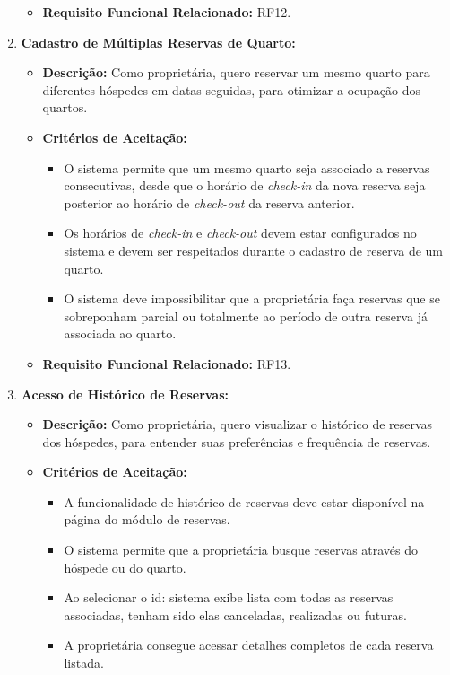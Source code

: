 \documentclass[
	12pt,				%
	openany,			%
	twoside,			%
	a4paper,			%
	english,			%
	french,				%
	spanish,			%
	brazil				%
	]{abntex2}
\begin{document}
\begin{enumerate}[label=\textbf{\arabic*.}]
\begin{itemize}
\begin{itemize}
	 	\end{itemize}
	 	\item \textbf{Requisito Funcional Relacionado:} RF12.
	 \end{itemize} 
	  \item \textbf{Cadastro de Múltiplas Reservas de Quarto:}
	 \begin{itemize}
	 	\item \textbf{Descrição:} Como proprietária, quero reservar um mesmo quarto para diferentes hóspedes em datas seguidas, para otimizar a ocupação dos quartos.
	 	\item \textbf{Critérios de Aceitação:}
	 	\begin{itemize}
	 		\item O sistema permite que um mesmo quarto seja associado a reservas consecutivas, desde que o horário de \textit{check-in} da nova reserva seja posterior ao horário de \textit{check-out} da reserva anterior.
	 		\item Os horários de \textit{check-in} e \textit{check-out} devem estar configurados no sistema e devem ser respeitados durante o cadastro de reserva de um quarto.
	 		\item O sistema deve impossibilitar que a proprietária faça reservas que se sobreponham parcial ou totalmente ao período de outra reserva já associada ao quarto.
	 	\end{itemize}
	 	\item \textbf{Requisito Funcional Relacionado:} RF13.
	 \end{itemize} 
	  \item \textbf{Acesso de Histórico de Reservas:}
	 \begin{itemize}
	 	\item \textbf{Descrição:} Como proprietária, quero visualizar o histórico de reservas dos hóspedes, para entender suas preferências e frequência de reservas.
	 	\item \textbf{Critérios de Aceitação:}
	 	\begin{itemize}
	 		\item A funcionalidade de histórico de reservas  deve estar disponível na página do módulo de reservas.
	 		\item O sistema permite que a proprietária busque reservas através do hóspede ou do quarto.
	 		\item Ao selecionar o id: sistema exibe lista com todas as reservas associadas, tenham sido elas canceladas, realizadas ou futuras.
	 		\item A proprietária consegue acessar detalhes completos de cada reserva listada.

\end{itemize}
\end{itemize}
\end{enumerate}
\end{document}
